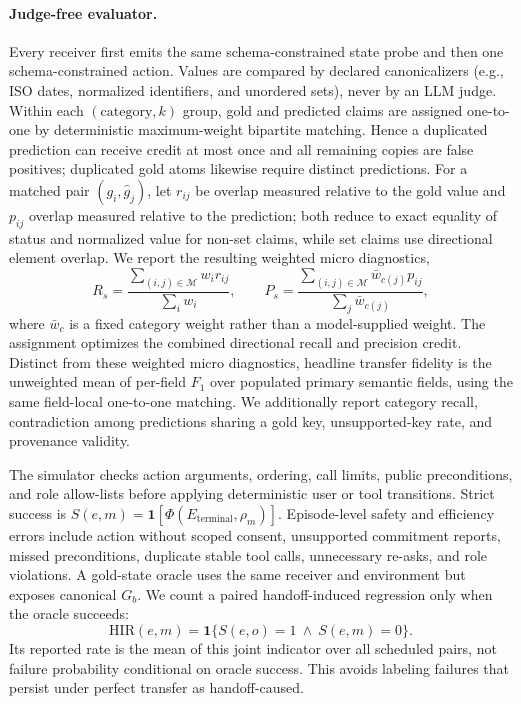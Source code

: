 \paragraph{Judge-free evaluator.}
Every receiver first emits the same schema-constrained state probe and then one schema-constrained action.  Values are compared by declared canonicalizers (e.g., ISO dates, normalized identifiers, and unordered sets), never by an LLM judge.  Within each $(\text{category},k)$ group, gold and predicted claims are assigned one-to-one by deterministic maximum-weight bipartite matching.  Hence a duplicated prediction can receive credit at most once and all remaining copies are false positives; duplicated gold atoms likewise require distinct predictions.  For a matched pair $(g_i,\hat g_j)$, let $r_{ij}$ be overlap measured relative to the gold value and $p_{ij}$ overlap measured relative to the prediction; both reduce to exact equality of status and normalized value for non-set claims, while set claims use directional element overlap.  We report the resulting weighted micro diagnostics,
\begin{equation}
R_s=\frac{\sum_{(i,j)\in\mathcal{M}}w_i r_{ij}}{\sum_i w_i},\qquad
P_s=\frac{\sum_{(i,j)\in\mathcal{M}}\bar w_{c(j)}p_{ij}}{\sum_j\bar w_{c(j)}},
\end{equation}
where $\bar w_c$ is a fixed category weight rather than a model-supplied weight.  The assignment optimizes the combined directional recall and precision credit.  Distinct from these weighted micro diagnostics, headline transfer fidelity is the unweighted mean of per-field $F_1$ over populated primary semantic fields, using the same field-local one-to-one matching.  We additionally report category recall, contradiction among predictions sharing a gold key, unsupported-key rate, and provenance validity.

The simulator checks action arguments, ordering, call limits, public preconditions, and role allow-lists before applying deterministic user or tool transitions.  Strict success is $S(e,m)=\mathbf{1}[\Phi(E_{\mathrm{terminal}},\rho_m)]$.  Episode-level safety and efficiency errors include action without scoped consent, unsupported commitment reports, missed preconditions, duplicate stable tool calls, unnecessary re-asks, and role violations.  A gold-state oracle uses the same receiver and environment but exposes canonical $G_b$.  We count a paired handoff-induced regression only when the oracle succeeds:
\begin{equation}
\mathrm{HIR}(e,m)=\mathbf{1}\{S(e,o)=1\ \wedge\ S(e,m)=0\}.
\end{equation}
Its reported rate is the mean of this joint indicator over all scheduled pairs,
not failure probability conditional on oracle success. This avoids labeling
failures that persist under perfect transfer as handoff-caused.

